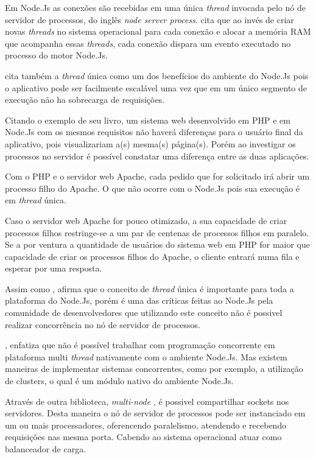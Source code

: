   Em Node.Js as conexões são recebidas em uma única \textit{thread} invocada pelo nó de servidor de processos, do inglês \textit{node server process}.
   cita que ao invés de criar novas \textit{threads}
  no sistema operacional para cada conexão e alocar a memória RAM que acompanha essas \textit{threads}, 
  cada conexão dispara um evento executado no processo do motor Node.Js.
  
  
   cita também a \textit{thread} única como um dos benefícios do ambiente do Node.Js 
  pois o aplicativo pode ser facilmente escalável uma vez que em um único segmento de execução não ha sobrecarga 
  de requisições. 
  
  Citando o exemplo de seu livro, um sistema web desenvolvido em \ac{PHP} e em Node.Js com os mesmos requisitos não haverá diferenças
  para o usuário final da aplicativo, pois visualizariam a(s) mesma(s) página(s). Porém ao investigar os processos no servidor é 
  possível constatar uma diferença entre as duas aplicações.
  
  Com o \ac{PHP} e o servidor web Apache, cada pedido que for solicitado irá abrir um 
  processo filho do Apache. O que não ocorre com o Node.Js pois sua execução é em \textit{thread} única.
  
  Caso o servidor web Apache for pouco otimizado, a sua capacidade de criar processos filhos
  restringe-se a um par de centenas de processos filhos em paralelo. Se a por ventura a quantidade de usuários do sistema web em \ac{PHP}
  for maior que capacidade de criar os processos filhos do Apache, o cliente entrará numa fila e esperar por uma resposta.\cite{Powers:2012}

  Assim como ,  afirma que o conceito de \textit{thread} única é importante para 
  toda a plataforma do Node.Js, porém é uma das críticas feitas ao Node.Js pela comunidade de desenvolvedores 
  que utilizando este conceito não é possivel realizar concorrência no nó de servidor de processos.
  
  , enfatiza que não é possível trabalhar com programação 
  concorrente em plataforma multi \textit{thread} nativamente com o ambiente Node.Js. Mas existem maneiras de implementar sistemas concorrentes, 
  como por exemplo, a utilização de clusters, o qual é um módulo nativo do ambiente Node.Js.
  
  Através de outra biblioteca, \textit{multi-node} , é possivel compartilhar sockets nos servidores.
  Desta maneira o nó de servidor de processos pode ser instanciado em um ou mais processadores, oferencendo paralelismo, 
  atendendo e recebendo requisições nas mesma porta. Cabendo ao sistema operacional atuar como balanceador de carga.\cite{Oliveira:2012}
  
